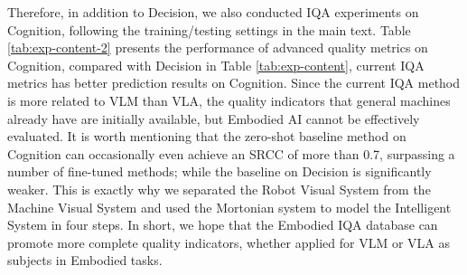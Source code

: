 \documentclass{article}
\begin{document}
Therefore, in addition to Decision, we also conducted IQA experiments on Cognition, following the training/testing settings in the main text. Table \ref{tab:exp-content-2} presents the performance of advanced quality metrics on Cognition, compared with Decision in Table \ref{tab:exp-content}, current IQA metrics has better prediction results on Cognition. Since the current IQA method is more related to VLM than VLA, the quality indicators that general machines already have are initially available, but Embodied AI cannot be effectively evaluated. It is worth mentioning that the zero-shot baseline method on Cognition can occasionally even achieve an SRCC of more than 0.7, surpassing a number of fine-tuned methods; while the baseline on Decision is significantly weaker. This is exactly why we separated the Robot Visual System from the Machine Visual System and used the Mortonian system to model the Intelligent System in four steps. In short, we hope that the Embodied IQA database can promote more complete quality indicators, whether applied for VLM or VLA as subjects in Embodied tasks.
\end{document}
